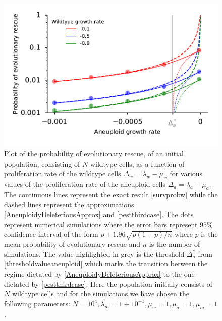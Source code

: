\documentclass[12pt]{extarticle}
\begin{document}
\begin{figure}[!h]
 \vspace*{1\baselineskip}
\includegraphics[width=1\textwidth]{Figures/P_est_divergence.pdf}
\caption{Plot of the probability of evolutionary rescue, of an initial population, consisting of $N$ wildtype cells, as a function of proliferation rate of the wildtype cells $\Delta_w=\lambda_w-\mu_w$ for various values of the proliferation rate of the aneuploid cells $\Delta_a=\lambda_a-\mu_a$. The continuous lines represent the exact result \eqref{survprobw} while the dashed lines represent the approximations \eqref{AneuploidyDeleteriousApprox} and \eqref{pestthirdcase}. The dots represent numerical simulations where the error bars represent $95\%$ confidence interval of the form $p\pm1.96\sqrt{p\left(1-p\right)/n}$ where $p$ is the mean probability of evolutionary rescue and $n$ is the number of simulations. The value highlighted in grey is the threshold $\Delta_a^*$ from \eqref{thresholdvalueaneuploid} which marks the transition between the regime dictated by \eqref{AneuploidyDeleteriousApprox} to the one dictated by \eqref{pestthirdcase}.  Here the population initially consists of $N$ wildtype cells and for the simulations we have chosen the following parameters: $N=10^4,\lambda_m=1+10^{-1},\mu_w=1,\mu_a=1,\mu_m=1$. }
\label{P_est}
\end{figure}
\end{document}

